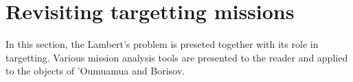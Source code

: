 \chapter{Revisiting targetting missions}

In this section, the Lambert's problem is preseted together with its role in
targetting. Various mission analysis tools are presented to the reader and
applied to the objects of 'Oumuamua and Borisov.





